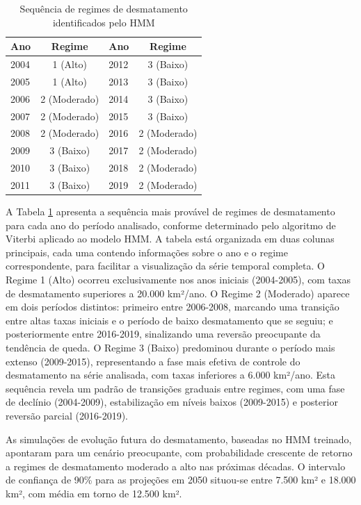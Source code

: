 \documentclass[12pt,a4paper]{article}
\begin{document}
\begin{table}[htbp]
\centering
\caption{Sequência de regimes de desmatamento identificados pelo HMM}
\label{tab:sequencia_estados}
\begin{tabular}{lc|lc}
\toprule
Ano  & Regime & Ano  & Regime \\
\midrule
2004 & 1 (Alto)     & 2012 & 3 (Baixo)     \\
2005 & 1 (Alto)     & 2013 & 3 (Baixo)     \\
2006 & 2 (Moderado) & 2014 & 3 (Baixo)     \\
2007 & 2 (Moderado) & 2015 & 3 (Baixo)     \\
2008 & 2 (Moderado) & 2016 & 2 (Moderado)  \\
2009 & 3 (Baixo)    & 2017 & 2 (Moderado)  \\
2010 & 3 (Baixo)    & 2018 & 2 (Moderado)  \\
2011 & 3 (Baixo)    & 2019 & 2 (Moderado)  \\
\bottomrule
\end{tabular}
\end{table}

A Tabela \ref{tab:sequencia_estados} apresenta a sequência mais provável de regimes de desmatamento para cada ano do período analisado, conforme determinado pelo algoritmo de Viterbi aplicado ao modelo HMM. A tabela está organizada em duas colunas principais, cada uma contendo informações sobre o ano e o regime correspondente, para facilitar a visualização da série temporal completa. O Regime 1 (Alto) ocorreu exclusivamente nos anos iniciais (2004-2005), com taxas de desmatamento superiores a 20.000 km²/ano. O Regime 2 (Moderado) aparece em dois períodos distintos: primeiro entre 2006-2008, marcando uma transição entre altas taxas iniciais e o período de baixo desmatamento que se seguiu; e posteriormente entre 2016-2019, sinalizando uma reversão preocupante da tendência de queda. O Regime 3 (Baixo) predominou durante o período mais extenso (2009-2015), representando a fase mais efetiva de controle do desmatamento na série analisada, com taxas inferiores a 6.000 km²/ano. Esta sequência revela um padrão de transições graduais entre regimes, com uma fase de declínio (2004-2009), estabilização em níveis baixos (2009-2015) e posterior reversão parcial (2016-2019).

As simulações de evolução futura do desmatamento, baseadas no HMM treinado, apontaram para um cenário preocupante, com probabilidade crescente de retorno a regimes de desmatamento moderado a alto nas próximas décadas. O intervalo de confiança de 90\% para as projeções em 2050 situou-se entre 7.500 km² e 18.000 km², com média em torno de 12.500 km².
\end{document}
